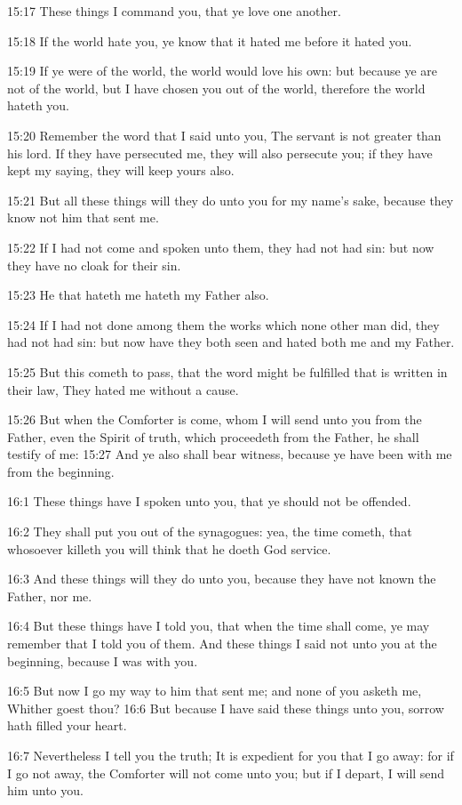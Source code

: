15:17 These things I command you, that ye love one another.

15:18 If the world hate you, ye know that it hated me before it hated you.

15:19 If ye were of the world, the world would love his own: but because ye are not of the world, but I have chosen you out of the world, therefore the world hateth you.

15:20 Remember the word that I said unto you, The servant is not greater than his lord. If they have persecuted me, they will also persecute you; if they have kept my saying, they will keep yours also.

15:21 But all these things will they do unto you for my name's sake, because they know not him that sent me.

15:22 If I had not come and spoken unto them, they had not had sin: but now they have no cloak for their sin.

15:23 He that hateth me hateth my Father also.

15:24 If I had not done among them the works which none other man did, they had not had sin: but now have they both seen and hated both me and my Father.

15:25 But this cometh to pass, that the word might be fulfilled that is written in their law, They hated me without a cause.

15:26 But when the Comforter is come, whom I will send unto you from the Father, even the Spirit of truth, which proceedeth from the Father, he shall testify of me: 15:27 And ye also shall bear witness, because ye have been with me from the beginning.

16:1 These things have I spoken unto you, that ye should not be offended.

16:2 They shall put you out of the synagogues: yea, the time cometh, that whosoever killeth you will think that he doeth God service.

16:3 And these things will they do unto you, because they have not known the Father, nor me.

16:4 But these things have I told you, that when the time shall come, ye may remember that I told you of them. And these things I said not unto you at the beginning, because I was with you.

16:5 But now I go my way to him that sent me; and none of you asketh me, Whither goest thou?  16:6 But because I have said these things unto you, sorrow hath filled your heart.

16:7 Nevertheless I tell you the truth; It is expedient for you that I go away: for if I go not away, the Comforter will not come unto you; but if I depart, I will send him unto you.

